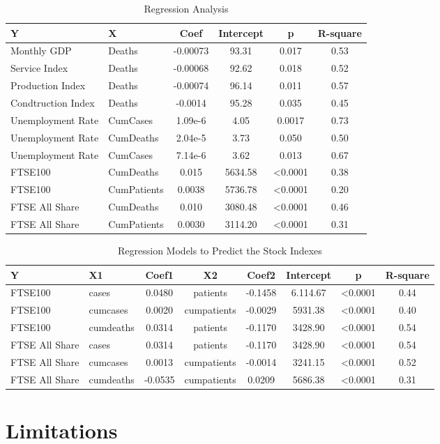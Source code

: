 \documentclass[12pt, a4paper]{report}
\begin{document}
\begin{table}[H]
    \begin{center}
    \begin{tabular}{llcccc}
        \toprule
        Y&X&Coef&Intercept&p&R-square\\
        \midrule
        Monthly GDP&Deaths&-0.00073&93.31&0.017&0.53\\
        Service Index&Deaths&-0.00068&92.62&0.018&0.52\\
        Production Index&Deaths&-0.00074&96.14&0.011&0.57\\
        Condtruction Index&Deaths&-0.0014&95.28&0.035&0.45\\
        Unemployment Rate&CumCases&1.09e-6&4.05&0.0017&0.73\\
        Unemployment Rate&CumDeaths&2.04e-5&3.73&0.050&0.50\\
        Unemployment Rate&CumCases&7.14e-6&3.62&0.013&0.67\\
        \midrule
        FTSE100&CumDeaths&0.015&5634.58&<0.0001&0.38\\
        FTSE100&CumPatients&0.0038&5736.78&<0.0001&0.20\\
        FTSE All Share&CumDeaths&0.010&3080.48&<0.0001&0.46\\
        FTSE All Share&CumPatients&0.0030&3114.20&<0.0001&0.31\\
        \bottomrule
    \end{tabular}
    \caption{Regression Analysis}
    \end{center}
\end{table}

\begin{table}[H]
    \begin{center}
    \begin{tabular}{llcccccc}
        \toprule
        Y&X1&Coef1&X2&Coef2&Intercept&p&R-square\\
        \midrule
        FTSE100&cases&0.0480&patients&-0.1458&6.114.67&<0.0001&0.44\\
        FTSE100&cumcases&0.0020&cumpatients&-0.0029&5931.38&<0.0001&0.40\\
        FTSE100&cumdeaths&0.0314&patients&-0.1170&3428.90&<0.0001&0.54\\
        FTSE All Share&cases&0.0314&patients&-0.1170&3428.90&<0.0001&0.54\\
        FTSE All Share&cumcases&0.0013&cumpatients&-0.0014&3241.15&<0.0001&0.52\\
        FTSE All Share&cumdeaths&-0.0535&cumpatients&0.0209&5686.38&<0.0001&0.31\\
        \bottomrule
    \end{tabular}
    \end{center}
    \caption{Regression Models to Predict the Stock Indexes}
\end{table}

\section{Limitations}

\begin{appendix}
\end{appendix}
\end{document}
